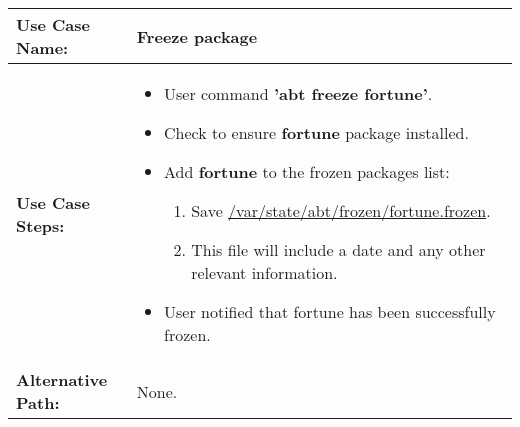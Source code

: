 \medskip

\begin{tabularx}{\linewidth}{|l|X|}
\hline
\textbf{Use Case Name:} & \textbf{Freeze package} \\
\hline
\textbf{Use Case Steps:} & 
\begin{minipage}{\linewidth} 
  \vspace{0.05em}
  \begin{itemize}
   \item User command \textbf{'abt freeze fortune'}.
    \item Check to ensure \textbf{fortune} package installed.
    \item Add \textbf{fortune} to the frozen packages list:
    \begin{enumerate}
      \item Save \url{/var/state/abt/frozen/fortune.frozen}.
      \item This file will include a date and any other relevant information.
    \end{enumerate}
    \item User notified that fortune has been successfully frozen.
  \end{itemize}
  \vspace{0.05em}
\end{minipage}
\\
\hline 
\textbf{Alternative Path:} & None. \\
\hline
\end{tabularx}